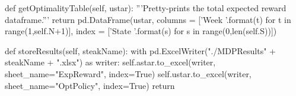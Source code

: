 \documentclass[12pt,a4paper]{article}
\begin{document}
\begin{python}
    def getOptimalityTable(self, ustar):
        '''Pretty-prints the total expected reward dataframe.'''
        return pd.DataFrame(ustar, columns = 
        ['Week {}'.format(t) for t in range(1,self.N+1)], 
         index   = ['State {}'.format(s) 
         for s in range(0,len(self.S))])
    
    def storeResults(self, steakName):
        with pd.ExcelWriter("./MDPResults" + steakName + ".xlsx") as writer:
            self.astar.to_excel(writer, sheet_name="ExpReward", index=True)
            self.ustar.to_excel(writer, sheet_name="OptPolicy", index=True)
        return
\end{python}
\end{document}
